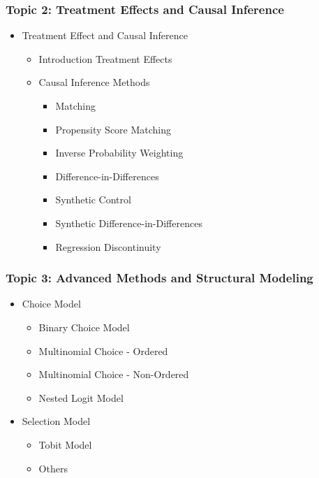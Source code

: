 \documentclass[10pt]{beamer}
\begin{document}
\begin{frame}
    \frametitle{Topic 2: Treatment Effects and Causal Inference}
    \begin{itemize}
        \item Treatment Effect and Causal Inference
        \begin{itemize}
            \item Introduction Treatment Effects
            \item Causal Inference Methods
            \begin{itemize}
                \item Matching
                \item Propensity Score Matching
                \item Inverse Probability Weighting
                \item Difference-in-Differences
                \item Synthetic Control
                \item Synthetic Difference-in-Differences
                \item Regression Discontinuity
            \end{itemize}
        \end{itemize}
    \end{itemize}
\end{frame}

\begin{frame}

\frametitle{Topic 3: Advanced Methods and Structural Modeling}
\begin{itemize}
    \item Choice Model
    \begin{itemize}
        \item Binary Choice Model
        \item Multinomial Choice - Ordered
        \item Multinomial Choice - Non-Ordered
        \item Nested Logit Model
    \end{itemize}

    \item Selection Model
    \begin{itemize}
        \item Tobit Model
        \item Others
    \end{itemize}
\end{itemize}
\end{frame}
\end{document}
